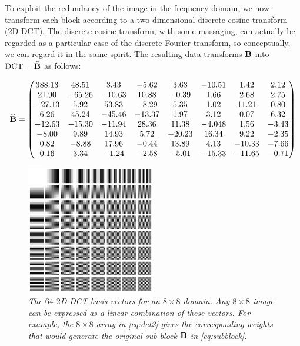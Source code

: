 To exploit the redundancy of the image in the frequency domain, we now transform each block according to a two-dimensional discrete cosine transform (2D-DCT). The discrete cosine transform, with some massaging, can actually be regarded as a particular case of the discrete Fourier transform, so conceptually, we can regard it in the same spirit. The resulting data transforms $\mathbf{B}$ into $\textnormal{DCT} = \widehat{\mathbf{B}}$ as follows:

\begin{equation}
\label{eq:dct2}
	\widehat{\mathbf{B}} = \begin{pmatrix}
	388.13 & 48.51 & 3.43 & -5.62 & 3.63 & -10.51 & 1.42 & 2.12\\
	21.90 &	-65.26	 & -10.63 &	10.88 &	-0.39 &	1.66 & 	2.68	& 2.75\\
	-27.13	 & 5.92 &	53.83 & -8.29 &	 5.35 &	1.02	& 11.21	& 0.80 \\
	6.26	& 45.24 &	-45.46 & -13.37 &	1.97 &	3.12 &	0.07	& 6.32 \\
	-12.63 &	-15.30	 & -11.94 &	28.36 &	11.38 &	-4.048 	& 1.56	& -3.43\\
	-8.00	 & 9.89 & 14.93	& 5.72 &	-20.23	 & 16.34	& 9.22 &	-2.35\\
	0.82	& -8.88 &	17.96 &	-0.44	& 13.89	& 4.13	 & -10.33	& -7.66\\
	0.16	& 3.34	& -1.24 & 	-2.58 & 	-5.01	 & -15.33  &	-11.65 &	-0.71	
	\end{pmatrix}
\end{equation}

\begin{figure}
\label{fig:jpeg8}
	\centering
	\includegraphics[width=0.5\textwidth]{chap4/figures/jpeg8.png}
	\caption{\em The $64$ $2$D DCT basis vectors for an $8\times8$ domain. Any $8\times8$ image can be expressed as a linear combination of these vectors. For example, the $8\times8$ array in \ref{eq:dct2} gives the corresponding weights that would generate the original sub-block $\mathbf{B}$ in \ref{eq:subblock}.}
\end{figure}

